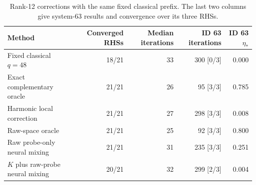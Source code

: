 \begin{table}[htbp]
\centering
\caption{Rank-12 corrections with the same fixed classical prefix. The last two columns give system-63 results and convergence over its three RHSs.}
\label{tab:raw-solver}
\small
\begin{tabular}{lrrrr}
\toprule
Method & Converged RHSs & Median iterations & ID 63 iterations & ID 63 $\eta_*$\\
\midrule
Fixed classical $q=48$ & 18/21 & 33 & 300 [0/3] & 0.000\\
Exact complementary oracle & 21/21 & 26 & 95 [3/3] & 0.785\\
Harmonic local correction & 21/21 & 27 & 298 [3/3] & 0.008\\
Raw-space oracle & 21/21 & 25 & 92 [3/3] & 0.800\\
Raw probe-only neural mixing & 21/21 & 31 & 235 [3/3] & 0.251\\
$K$ plus raw-probe neural mixing & 20/21 & 32 & 299 [2/3] & 0.004\\
\bottomrule
\end{tabular}
\end{table}

